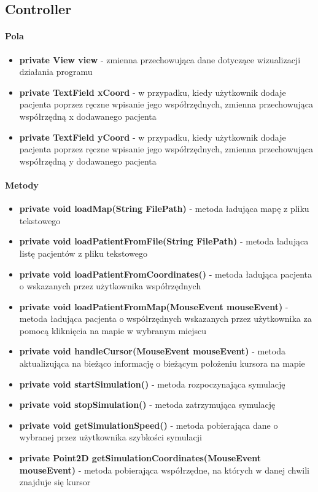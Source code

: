 \documentclass[]{article}
\begin{document}
            \subsection{Controller}
            \paragraph{Pola}
                    \begin{itemize}
                        \item \textbf{private View view} - zmienna przechowująca dane dotyczące wizualizacji działania programu
                        \item \textbf{private TextField xCoord} - w przypadku, kiedy użytkownik dodaje pacjenta poprzez ręczne wpisanie jego współrzędnych, zmienna przechowująca współrzędną x dodawanego pacjenta
                        \item \textbf{private TextField yCoord} - w przypadku, kiedy użytkownik dodaje pacjenta poprzez ręczne wpisanie jego współrzędnych, zmienna przechowująca współrzędną y dodawanego pacjenta
                    \end{itemize}
                \paragraph{Metody}
                    \begin{itemize}
                        \item \textbf{private void loadMap(String FilePath)} - metoda ładująca mapę z pliku tekstowego
                        \item \textbf{private void loadPatientFromFile(String FilePath)} - metoda ładująca listę pacjentów z pliku tekstowego
                        \item \textbf{private void loadPatientFromCoordinates()} - metoda ładująca pacjenta o wskazanych przez użytkownika współrzędnych
                        \item \textbf{private void loadPatientFromMap(MouseEvent mouseEvent)} - metoda ładująca pacjenta o współrzędnych wskazanych przez użytkownika za pomocą kliknięcia na mapie w wybranym miejscu
                        \item \textbf{private void handleCursor(MouseEvent mouseEvent)} - metoda aktualizująca na bieżąco informację o bieżącym położeniu kursora na mapie
                        \item \textbf{private void startSimulation()} - metoda rozpoczynająca symulację
                        \item \textbf{private void stopSimulation()} - metoda zatrzymująca symulację
                        \item \textbf{private void getSimulationSpeed()} - metoda pobierająca dane o wybranej przez użytkownika szybkości symulacji
                        \item \textbf{private Point2D getSimulationCoordinates(MouseEvent mouseEvent)} - metoda pobierająca współrzędne, na których w danej chwili znajduje się kursor
                    \end{itemize}
\end{document}
